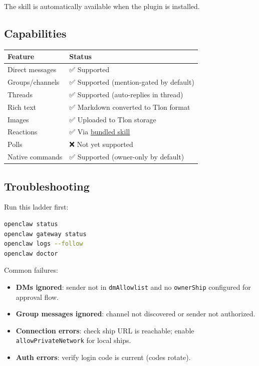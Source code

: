The skill is automatically available when the plugin is installed.

\subsection{Capabilities}



\begin{table}[h]
\centering
\small
\begin{tabular}{|l|l|}
\hline
Feature & Status \\
\hline
Direct messages & ✅ Supported \\
\hline
Groups/channels & ✅ Supported (mention-gated by default) \\
\hline
Threads & ✅ Supported (auto-replies in thread) \\
\hline
Rich text & ✅ Markdown converted to Tlon format \\
\hline
Images & ✅ Uploaded to Tlon storage \\
\hline
Reactions & ✅ Via \href{\#bundled-skill}{bundled skill} \\
\hline
Polls & ❌ Not yet supported \\
\hline
Native commands & ✅ Supported (owner-only by default) \\
\hline
\end{tabular}
\end{table}



\subsection{Troubleshooting}


Run this ladder first:

\begin{lstlisting}[language=bash]
openclaw status
openclaw gateway status
openclaw logs --follow
openclaw doctor
\end{lstlisting}


Common failures:

\begin{itemize}
  \item \textbf{DMs ignored}: sender not in \texttt{dmAllowlist} and no \texttt{ownerShip} configured for approval flow.
  \item \textbf{Group messages ignored}: channel not discovered or sender not authorized.
  \item \textbf{Connection errors}: check ship URL is reachable; enable \texttt{allowPrivateNetwork} for local ships.
  \item \textbf{Auth errors}: verify login code is current (codes rotate).
\end{itemize}


